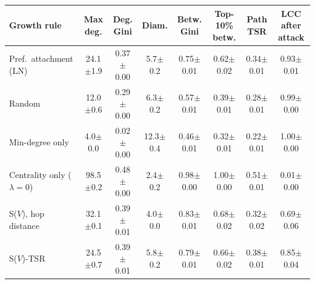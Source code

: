\begin{tabular}{lccccccc}
\toprule
Growth rule & Max deg. & Deg. Gini & Diam. & Betw. Gini & Top-10\% betw. & Path TSR & LCC after attack \\
\midrule
Pref.\ attachment (LN) & 24.1$\pm$1.9 & 0.37$\pm$0.00 & 5.7$\pm$0.2 & 0.75$\pm$0.01 & 0.62$\pm$0.02 & 0.34$\pm$0.01 & 0.93$\pm$0.01 \\
Random & 12.0$\pm$0.6 & 0.29$\pm$0.00 & 6.3$\pm$0.2 & 0.57$\pm$0.01 & 0.39$\pm$0.01 & 0.28$\pm$0.01 & 0.99$\pm$0.00 \\
Min-degree only & 4.0$\pm$0.0 & 0.02$\pm$0.00 & 12.3$\pm$0.4 & 0.46$\pm$0.01 & 0.32$\pm$0.01 & 0.22$\pm$0.01 & 1.00$\pm$0.00 \\
Centrality only ($\lambda{=}0$) & 98.5$\pm$0.2 & 0.48$\pm$0.00 & 2.4$\pm$0.2 & 0.98$\pm$0.00 & 1.00$\pm$0.00 & 0.51$\pm$0.01 & 0.01$\pm$0.00 \\
S($V$), hop distance & 32.1$\pm$0.1 & 0.39$\pm$0.01 & 4.0$\pm$0.0 & 0.83$\pm$0.01 & 0.68$\pm$0.02 & 0.32$\pm$0.02 & 0.69$\pm$0.06 \\
S($V$)-TSR & 24.5$\pm$0.7 & 0.39$\pm$0.01 & 5.8$\pm$0.2 & 0.79$\pm$0.01 & 0.66$\pm$0.02 & 0.38$\pm$0.01 & 0.85$\pm$0.04 \\
\bottomrule
\end{tabular}
